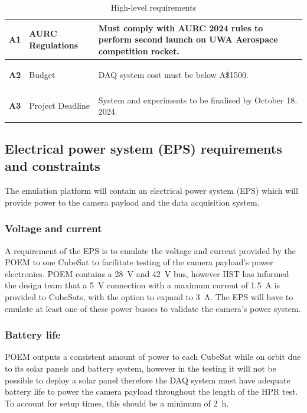 \documentclass{report}
\newcommand{\aud}{A\$}
\begin{document}
\begin{table}[h!]
\begin{tabular}{|l|l|p{}|}
    \hypertarget{req-A1}{\textbf{A1}} & AURC Regulations               & Must comply with AURC 2024 rules to perform second launch on UWA Aerospace competition rocket.               \\ \hline
    \hypertarget{req-A2}{\textbf{A2}} & Budget                         & DAQ system cost must be below \aud 1500.                                                                     \\ \hline
    \hypertarget{req-A3}{\textbf{A3}} & Project Deadline               & System and experiments to be finalised by October 18, 2024.                                                  \\ \hline
  \end{tabular}
  \caption{High-level requirements}
  \label{tabl:high-level-requirements}
\end{table}


\subsection{Electrical power system (EPS) requirements and constraints}
The emulation platform will contain an electrical power system (EPS) which will provide power to the camera payload and the data acquisition system.

\subsubsection{Voltage and current}
A requirement of the EPS is to emulate the voltage and current provided by the POEM to one CubeSat to facilitate testing of the camera payload's power electronics. POEM contains a \SI{28}{\volt} and \SI{42}{\volt} bus, however IIST has informed the design team that a \SI{5}{\volt} connection with a maximum current of \SI{1.5}{\ampere} is provided to CubeSats, with the option to expand to \SI{3}{\ampere}. The EPS will have to emulate at least one of these power busses to validate the camera's power system.

\subsubsection{Battery life}
POEM outputs a consistent amount of power to each CubeSat while on orbit due to its solar panels and battery system, however in the testing it will not be possible to deploy a solar panel therefore the DAQ system must have adequate battery life to power the camera payload throughout the length of the HPR test. To account for setup times, this should be a minimum of \SI{2}{\hour}.
\end{document}
